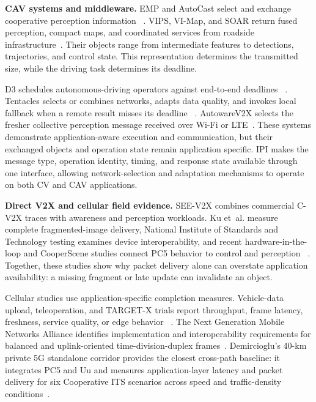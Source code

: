\textbf{CAV systems and middleware.}
EMP and AutoCast select and exchange cooperative perception information
~\cite{zhang2021emp,qiu2022autocast}. VIPS, VI-Map, and SOAR return fused
perception, compact maps, and coordinated services from roadside
infrastructure~\cite{shi2022vips,he2023vimap,shi2024soar}. Their objects range
from intermediate features to detections, trajectories, and control state.
This representation determines the transmitted size, while the driving task
determines its deadline.

D3 schedules autonomous-driving operators against end-to-end deadlines
~\cite{gog2022d3}. Tentacles selects or combines networks, adapts data quality,
and invokes local fallback when a remote result misses its deadline
~\cite{wu2024tentacles}. AutowareV2X selects the fresher collective perception
message received over Wi-Fi or LTE~\cite{asabe2024autowarev2x}. These systems
demonstrate application-aware execution and communication, but their exchanged
objects and operation state remain application specific. IPI makes the message
type, operation identity, timing, and response state available through one
interface, allowing network-selection and adaptation mechanisms to operate on
both CV and CAV applications.

\textbf{Direct V2X and cellular field evidence.}
SEE-V2X combines commercial C-V2X traces with awareness and perception
workloads. Ku et~al. measure complete fragmented-image delivery, National
Institute of Standards and Technology testing examines device
interoperability, and recent hardware-in-the-loop and CooperScene studies
connect PC5 behavior to control and perception
~\cite{mo2025seev2x,ku2022adaptive,song2024nist,zhan2026hil,wu2026cooperscene}.
Together, these studies show why packet delivery alone can overstate
application availability: a missing fragment or late update can invalidate an
object.

Cellular studies use application-specific completion measures. Vehicle-data
upload, teleoperation, and TARGET-X trials report throughput, frame latency,
freshness, service quality, or edge behavior
~\cite{carpenter2023multimodal,kakkavas2022teso,fezeu2025teleoperating,
nasreddine2026targetx}. The Next Generation Mobile Networks Alliance identifies
implementation and interoperability requirements for balanced and
uplink-oriented time-division-duplex frames~\cite{ngmn2021tdd}. Demircioglu's
40-km private 5G standalone corridor provides the closest cross-path baseline:
it integrates PC5 and Uu and measures application-layer latency and packet
delivery for six Cooperative ITS scenarios across speed and traffic-density
conditions~\cite{demircioglu2026corridor}.


